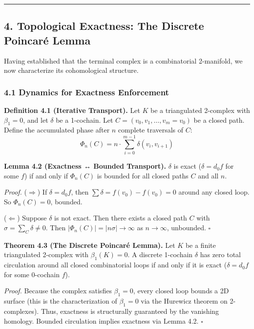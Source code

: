 \documentclass[
]{article}
\begin{document}
\begin{center}\rule{0.5\linewidth}{0.5pt}\end{center}

\subsection{4. Topological Exactness: The Discrete Poincaré
Lemma}\label{topological-exactness-the-discrete-poincaruxe9-lemma}

Having established that the terminal complex is a combinatorial
2-manifold, we now characterize its cohomological structure.

\subsubsection{4.1 Dynamics for Exactness
Enforcement}\label{dynamics-for-exactness-enforcement}

\textbf{Definition 4.1 (Iterative Transport).} Let \(K\) be a
triangulated 2-complex with \(\beta_1 = 0\), and let \(\delta\) be a
1-cochain. Let \(C = (v_0, v_1, \ldots, v_m = v_0)\) be a closed path.
Define the accumulated phase after \(n\) complete traversals of \(C\):
\[\Phi_n(C) = n \cdot \sum_{i=0}^{m-1} \delta(v_i, v_{i+1})\]

\textbf{Lemma 4.2 (Exactness ↔ Bounded Transport).} \(\delta\) is exact
(\(\delta = d_0 f\) for some \(f\)) if and only if \(\Phi_n(C)\) is
bounded for all closed paths \(C\) and all \(n\).

\emph{Proof.} (\(\Rightarrow\)) If \(\delta = d_0 f\), then
\(\sum \delta = f(v_0) - f(v_0) = 0\) around any closed loop. So
\(\Phi_n(C) = 0\), bounded.

(\(\Leftarrow\)) Suppose \(\delta\) is not exact. Then there exists a
closed path \(C\) with \(\sigma = \sum_{C} \delta \neq 0\). Then
\(|\Phi_n(C)| = |n\sigma| \to \infty\) as \(n \to \infty\), unbounded.
\(\square\)

\textbf{Theorem 4.3 (The Discrete Poincaré Lemma).} Let \(K\) be a
finite triangulated 2-complex with \(\beta_1(K) = 0\). A discrete
1-cochain \(\delta\) has zero total circulation around all closed
combinatorial loops if and only if it is exact (\(\delta = d_0 f\) for
some 0-cochain \(f\)).

\emph{Proof.} Because the complex satisfies \(\beta_1 = 0\), every
closed loop bounds a 2D surface (this is the characterization of
\(\beta_1 = 0\) via the Hurewicz theorem on 2-complexes). Thus,
exactness is structurally guaranteed by the vanishing homology. Bounded
circulation implies exactness via Lemma 4.2. \(\square\)
\end{document}
